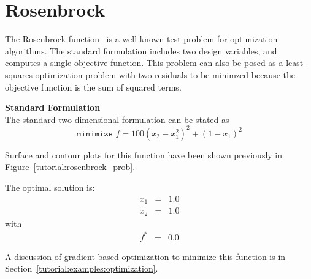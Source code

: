 \clearpage
\section{Rosenbrock}\label{additional:rosenbrock}

The Rosenbrock function~\cite{Gil81} is a well known test problem
for optimization algorithms. The standard formulation includes two design variables,
and computes a single objective function.
This problem can also be posed as a least-squares optimization
problem with two residuals to be minimzed because the objective
function is the sum of squared terms.


{\bf Standard Formulation} \\
The standard two-dimensional formulation can be stated as
\begin{equation}
\texttt{minimize } f=100(x_2-x_1^2)^2+(1-x_1)^2 \label{additional:rosenstd}
\end{equation}

Surface and contour plots for this function have been shown previously
in Figure~\ref{tutorial:rosenbrock_prob}.

The optimal solution is:
\begin{eqnarray*}
    x_1 &=& 1.0 \\
    x_2 &=& 1.0
\end{eqnarray*}
with
\begin{eqnarray*}
    f^{\ast} &=& 0.0
\end{eqnarray*}

A discussion of gradient based optimization to minimize
this function is in Section~\ref{tutorial:examples:optimization}.

%
%

